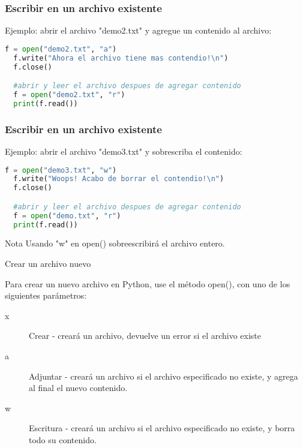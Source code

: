 \begin{frame}[fragile]
  \frametitle{Escribir en un archivo existente}

  Ejemplo: abrir el archivo "demo2.txt" y agregue un
  contenido al archivo: 

  \vspace{\baselineskip}
  \begin{lstlisting}[language=Python]
  f = open("demo2.txt", "a")
  f.write("Ahora el archivo tiene mas contendio!\n")
  f.close()

  #abrir y leer el archivo despues de agregar contenido
  f = open("demo2.txt", "r")
  print(f.read()) 
  \end{lstlisting}
\end{frame}

\begin{frame}[fragile]
  \frametitle{Escribir en un archivo existente}

  Ejemplo: abrir el archivo "demo3.txt" y sobrescriba el
  contenido: 

  \vspace{\baselineskip}
  \begin{lstlisting}[language=Python]
  f = open("demo3.txt", "w")
  f.write("Woops! Acabo de borrar el contendio!\n")
  f.close()

  #abrir y leer el archivo despues de agregar contenido
  f = open("demo.txt", "r")
  print(f.read())
  \end{lstlisting}

  \vspace{\baselineskip}
  \begin{alertblock}{Nota}
    Usando "w" en open() sobreescribirá el archivo entero.
  \end{alertblock}
\end{frame}


\begin{frame}[c]{Crear un archivo nuevo}

  Para crear un nuevo archivo en Python, use el método
  \textcolor{codeKeyword2}{open}(),
  con uno de los siguientes parámetros:

  \vspace{\baselineskip}
  \begin{description}
    \item[x] Crear - creará un archivo, devuelve un error si el archivo existe
    \pausa
    \item[a] Adjuntar - creará un archivo si el archivo especificado no
      existe, y agrega al final el nuevo contenido.
    \pausa
    \item[w] Escritura - creará un archivo si el archivo especificado no
      existe, y borra todo su contenido.
  \end{description}
\end{frame}

